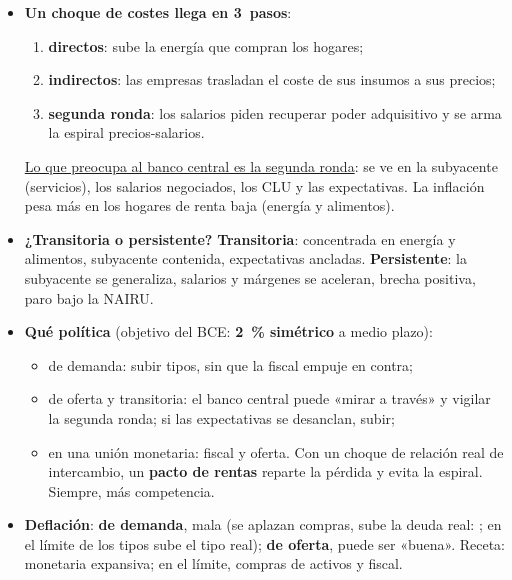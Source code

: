 \documentclass{article}
\begin{document}
\begin{columnas}
\begin{itemize}[itemsep=1.5pt]
\item \textbf{Un choque de costes llega en 3~pasos}:
  \begin{enumerate}
  \item \textbf{directos}: sube la energía que compran los hogares;
  \item \textbf{indirectos}: las empresas trasladan el coste de sus insumos a sus precios;
  \item \textbf{segunda ronda}: los salarios piden recuperar poder adquisitivo y se arma la espiral precios-salarios.
  \end{enumerate}
\uline{Lo que preocupa al banco central es la segunda ronda}: se ve en la subyacente (servicios), los salarios negociados, los CLU y las expectativas. La inflación pesa más en los hogares de renta baja (energía y alimentos).
\item \textbf{¿Transitoria o persistente?} \textbf{Transitoria}: concentrada en energía y alimentos, subyacente contenida, expectativas ancladas. \textbf{Persistente}: la subyacente se generaliza, salarios y márgenes se aceleran, brecha positiva, paro bajo la NAIRU.
\item \textbf{Qué política} (objetivo del BCE: \textbf{2~\% simétrico} a medio plazo):
  \begin{itemize}
  \item de demanda: subir tipos, sin que la fiscal empuje en contra;
  \item de oferta y transitoria: el banco central puede «mirar a través» y vigilar la segunda ronda; si las expectativas se desanclan, subir;
  \item en una unión monetaria: fiscal y oferta. Con un choque de relación real de intercambio, un \textbf{pacto de rentas} reparte la pérdida y evita la espiral. Siempre, más competencia.
  \end{itemize}
\item \textbf{Deflación}: \textbf{de demanda}, mala (se aplazan compras, sube la deuda real: ; en el límite de los tipos sube el tipo real); \textbf{de oferta}, puede ser «buena». Receta: monetaria expansiva; en el límite, compras de activos y fiscal.
\end{itemize}


\end{columnas}
\end{document}
